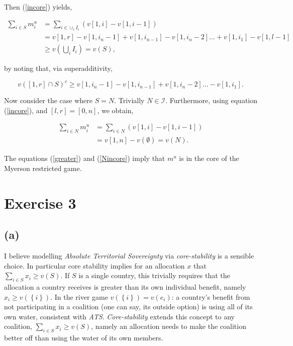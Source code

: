\documentclass[american]{scrartcl}
\newcommand{\set}[1]{\left\{#1\right\}}
\begin{document}
Then (\ref{incore}) yields,

\begin{equation} \label{greater}
    \begin{split}
        \sum_{i \in S} m^u_i &= \sum_{i \in \cup_i I_i} \left(v[1, i] - v[1, i-1]\right) \\
        &= v[1, r] - v[1, i_n - 1] + v[1, i_{n-1}] - v[1, i_n - 2] \ldots + v[1, i_1] - v[1, l-1] \\
        &\geq v\left(\bigcup_i I_i\right) = v(S),
    \end{split}
\end{equation}

by noting that, via superadditivity,

\begin{equation}
    v\left([1, r] \cap S\right)^c \geq v[1, i_n - 1] - v[1, i_{n-1}] + v[1, i_n - 2] \ldots - v[1, i_1].
\end{equation}

Now consider the case where $S = N$. Trivially $N \in \mathcal{I}$. Furthermore, using equation (\ref{incore}), and $[l, r] = [0, n]$, we obtain,

\begin{equation} \label{Nincore}
    \begin{split}
        \sum_{i \in N} m^u_i &= \sum_{i \in N} \left(v[1, i] - v[1, i-1]\right) \\
        &= v[1, n] - v(\emptyset) = v(N).
    \end{split}
\end{equation}

The equations (\ref{greater}) and (\ref{Nincore}) imply that $m^u$ is in the core of the Myerson restricted game.

\section*{Exercise 3}

\subsection*{(a)}

I believe modelling \textit{Absolute Territorial Sovereignty} via \textit{core-stability} is a sensible choice. In particular core stability implies for an allocation $x$ that $\sum_{i \in S} x_i \geq v(S)$. If $S$ is a single country, this trivially requires that the allocation a country receives is greater than its own individual benefit, namely $x_i \geq v(\set{i})$. In the river game $v(\set{i}) = v(e_i)$: a country's benefit from not participating in a coalition (one can say, its outside option) is using all of its own water, consistent with \textit{ATS}. \textit{Core-stability} extends this concept to any coalition, $\sum_{i \in S} x_i \geq v(S)$, namely an allocation needs to make the coalition better off than using the water of its own members.
\end{document}
